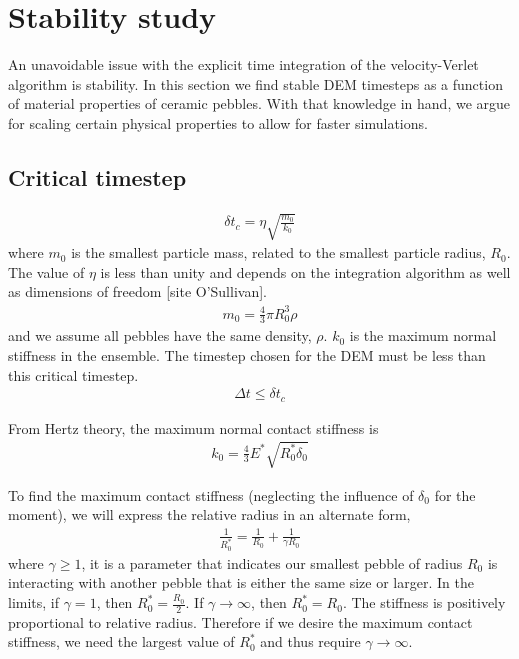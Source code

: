 \section{Stability study}
An unavoidable issue with the explicit time integration of the velocity-Verlet algorithm is stability. In this section we find stable DEM timesteps as a function of material properties of ceramic pebbles. With that knowledge in hand, we argue for scaling certain physical properties to allow for faster simulations.

\subsection{Critical timestep}

\begin{align}
\delta t_c = \eta  \sqrt{\frac{m_0}{k_0}}
\end{align}
where $m_0$ is the smallest particle mass, related to the smallest particle radius, $R_0$. The value of $\eta$ is less than unity and depends on the integration algorithm as well as dimensions of freedom [site O'Sullivan].
\begin{align}
m_0 = \frac{4}{3} \pi R_0^3 \rho
\end{align}
and we assume all pebbles have the same density, $\rho$. $k_0$ is the maximum normal stiffness in the ensemble. The timestep chosen for the DEM must be less than this critical timestep.
\begin{align}
\Delta t \le \delta t_c
\end{align}

From Hertz theory, the maximum normal contact stiffness is
\begin{align}
k_0 = \frac{4}{3} E^* \sqrt{R^*_0 \delta_0}
\end{align}

To find the maximum contact stiffness (neglecting the influence of $\delta_0$ for the moment), we will express the relative radius in an alternate form,
\begin{align}
\frac{1}{R^*_0} = \frac{1}{R_0} + \frac{1}{\gamma R_0}
\end{align}
where $\gamma \ge 1$, it is a parameter that indicates our smallest pebble of radius $R_0$ is interacting with another pebble that is either the same size or larger. In the limits, if $\gamma =1$, then $R^*_0 = \frac{R_0}{2}$. If $\gamma \rightarrow \infty$, then $R^*_0 = R_0$. The stiffness is positively proportional to relative radius. Therefore if we desire the maximum contact stiffness, we need the largest value of $R^*_0$ and thus require $\gamma \rightarrow \infty$.

